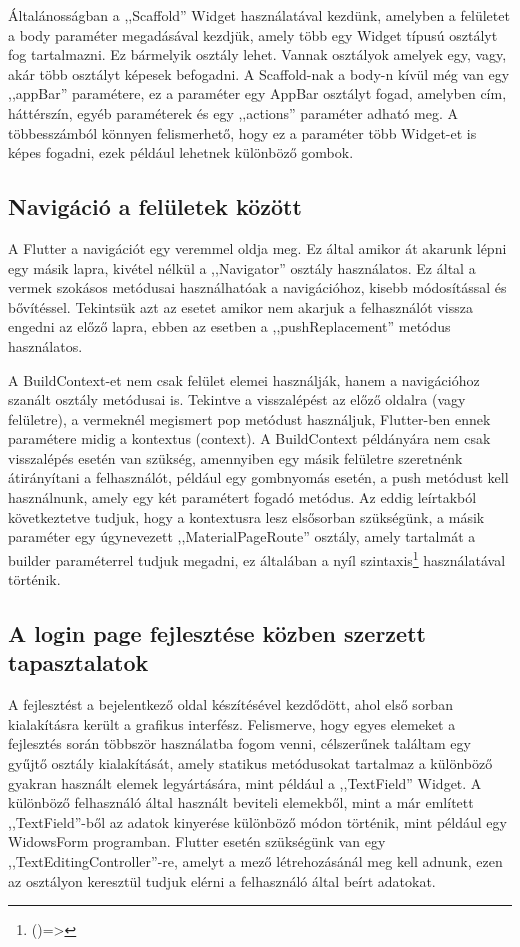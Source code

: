 \documentclass{thesis-ekf}
\theoremstyle{definition}
\theoremstyle{remark}
\begin{document}
	Általánosságban a ,,Scaffold'' Widget használatával kezdünk, amelyben a felületet a body paraméter megadásával kezdjük, amely több egy Widget típusú osztályt fog tartalmazni. Ez bármelyik osztály lehet. Vannak osztályok amelyek egy, vagy, akár  több osztályt képesek befogadni. A Scaffold-nak a body-n kívül még van egy ,,appBar'' paramétere, ez a paraméter egy AppBar osztályt fogad, amelyben cím, háttérszín, egyéb paraméterek és egy ,,actions'' paraméter adható meg. A többesszámból könnyen felismerhető, hogy ez a paraméter több Widget-et is képes fogadni, ezek például lehetnek különböző gombok.
	\subsection{Navigáció a felületek között}
	A Flutter a navigációt egy veremmel oldja meg. Ez által amikor át akarunk lépni egy másik lapra, kivétel nélkül a ,,Navigator'' osztály használatos. Ez által a vermek szokásos metódusai használhatóak a navigációhoz, kisebb módosítással és bővítéssel. Tekintsük azt az esetet amikor nem akarjuk a felhasználót vissza engedni az előző lapra, ebben az esetben a ,,pushReplacement'' metódus használatos.
	
	A BuildContext-et nem csak felület elemei használják, hanem a navigációhoz szanált osztály metódusai is. Tekintve a visszalépést az előző oldalra (vagy felületre), a vermeknél megismert pop metódust használjuk, Flutter-ben  ennek paramétere midig a kontextus (context). A BuildContext példányára nem csak visszalépés esetén van szükség, amennyiben egy másik felületre szeretnénk átirányítani a felhasználót, például egy gombnyomás esetén, a push metódust kell használnunk, amely egy két paramétert fogadó metódus. Az eddig leírtakból következtetve tudjuk, hogy a kontextusra lesz elsősorban szükségünk, a másik paraméter egy úgynevezett ,,MaterialPageRoute'' osztály, amely tartalmát a builder paraméterrel tudjuk megadni, ez általában a nyíl szintaxis\footnote{()=>} használatával történik.
	\subsection{A login page fejlesztése közben szerzett tapasztalatok}
	A fejlesztést a bejelentkező oldal készítésével kezdődött, ahol első sorban kialakításra került a grafikus interfész. Felismerve, hogy egyes elemeket a fejlesztés során többször használatba fogom venni, célszerűnek találtam egy gyűjtő osztály kialakítását, amely statikus metódusokat tartalmaz a különböző gyakran használt elemek legyártására, mint például a ,,TextField'' Widget. A különböző felhasználó által használt beviteli elemekből, mint a már említett ,,TextField''-ből az adatok kinyerése különböző módon történik, mint például egy WidowsForm programban. Flutter esetén szükségünk van egy ,,TextEditingController''-re, amelyt a mező létrehozásánál meg kell adnunk, ezen az osztályon keresztül tudjuk elérni a felhasználó által beírt adatokat.
	
\end{document}
